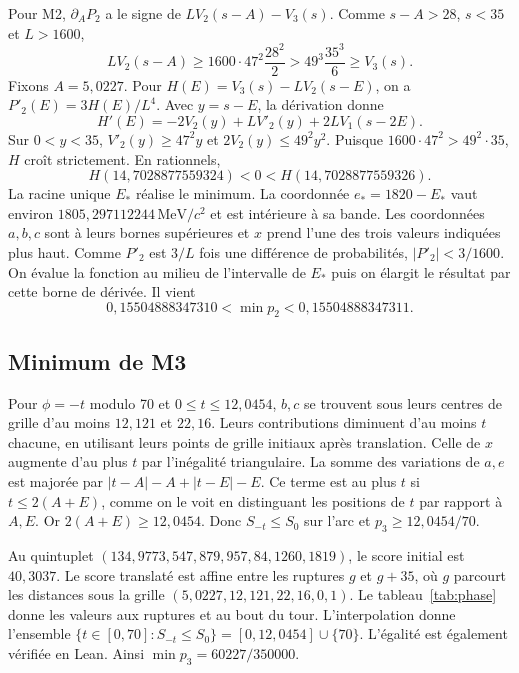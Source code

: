 \documentclass[11pt,a4paper]{article}
\newcommand{\unit}{\,\mathrm{MeV}/c^{2}}
\begin{document}
Pour M2, $\partial_A P_2$ a le signe de $LV_2(s-A)-V_3(s)$. Comme $s-A>28$, $s<35$ et $L>1600$,
\[
LV_2(s-A)\geq1600\cdot47^2\frac{28^2}{2}
>49^3\frac{35^3}{6}\geq V_3(s).
\]
Fixons $A=5{,}0227$. Pour $H(E)=V_3(s)-LV_2(s-E)$, on a $P'_2(E)=3H(E)/L^4$. Avec $y=s-E$, la dérivation donne
\[
H'(E)=-2V_2(y)+LV'_2(y)+2LV_1(s-2E).
\]
Sur $0<y<35$, $V'_2(y)\geq47^2y$ et $2V_2(y)\leq49^2y^2$. Puisque $1600\cdot47^2>49^2\cdot35$, $H$ croît strictement. En rationnels,
\[
H(14{,}7028877559324)<0<H(14{,}7028877559326).
\]
La racine unique $E_*$ réalise le minimum. La coordonnée $e_*=1820-E_*$ vaut environ $1805{,}297112244\unit$ et est intérieure à sa bande. Les coordonnées $a,b,c$ sont à leurs bornes supérieures et $x$ prend l'une des trois valeurs indiquées plus haut. Comme $P'_2$ est $3/L$ fois une différence de probabilités, $|P'_2|<3/1600$. On évalue la fonction au milieu de l'intervalle de $E_*$ puis on élargit le résultat par cette borne de dérivée. Il vient
\[
0{,}15504888347310<\min p_2<0{,}15504888347311.
\]

\subsection{Minimum de M3}

Pour $\phi=-t$ modulo 70 et $0\leq t\leq12{,}0454$, $b,c$ se trouvent sous leurs centres de grille d'au moins $12{,}121$ et $22{,}16$. Leurs contributions diminuent d'au moins $t$ chacune, en utilisant leurs points de grille initiaux après translation. Celle de $x$ augmente d'au plus $t$ par l'inégalité triangulaire. La somme des variations de $a,e$ est majorée par $|t-A|-A+|t-E|-E$. Ce terme est au plus $t$ si $t\leq2(A+E)$, comme on le voit en distinguant les positions de $t$ par rapport à $A,E$. Or $2(A+E)\geq12{,}0454$. Donc $S_{-t}\leq S_0$ sur l'arc et $p_3\geq12{,}0454/70$.

Au quintuplet $(134{,}9773,547{,}879,957{,}84,1260,1819)$, le score initial est $40{,}3037$. Le score translaté est affine entre les ruptures $g$ et $g+35$, où $g$ parcourt les distances sous la grille $(5{,}0227,12{,}121,22{,}16,0,1)$. Le tableau~\ref{tab:phase} donne les valeurs aux ruptures et au bout du tour. L'interpolation donne l'ensemble $\{t\in[0,70]:S_{-t}\leq S_0\}=[0,12{,}0454]\cup\{70\}$. L'égalité est également vérifiée en Lean. Ainsi $\min p_3=60227/350000$.
\end{document}
